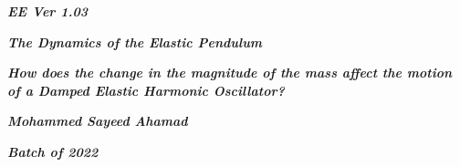 

\begin{titlepage}
    \begin{center}
        \vspace*{1cm}
            
        \date{}
            
        \huge
            
        \textit{\textbf{EE Ver 1.03}}
            
        \vspace{0.25cm}
            
        \hline
            
        \vspace{2.5cm}
            
        \textit{\textbf{The Dynamics of the Elastic Pendulum}}
            
        \vspace{1cm}
            
        \LARGE
            
        \textit{\textbf{How does the change in the magnitude of the mass affect the motion of a Damped Elastic Harmonic Oscillator? }}
            
        \vspace{2.5cm}
            
        \Large
            
        \textit{\textbf{Mohammed Sayeed Ahamad}}
            
        \vspace{4cm}
            
        \Large
            
        \textit{\textbf{Batch of 2022}}
            
        \vspace{0.25cm}
            
        \hline
           
            
    \end{center}
\end{titlepage}



